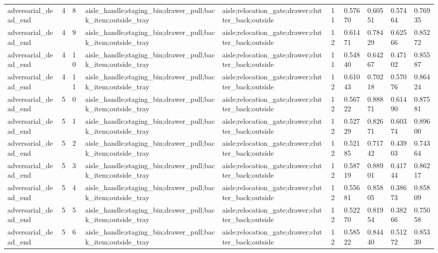 \documentclass{article}
\begin{document}
\begin{table}[tbp]
{\begin{tabular}{llllllllll}
adversarial\_dead\_end & 4 & 8 & aisle\_handle;staging\_bin;drawer\_pull;back\_item;outside\_tray & aisle;relocation\_gate;drawer;clutter\_back;outside & 11 & 0.57670 & 0.60551 & 0.57464 & 0.76935 \\
adversarial\_dead\_end & 4 & 9 & aisle\_handle;staging\_bin;drawer\_pull;back\_item;outside\_tray & aisle;relocation\_gate;drawer;clutter\_back;outside & 12 & 0.61471 & 0.78429 & 0.62566 & 0.85272 \\
adversarial\_dead\_end & 4 & 10 & aisle\_handle;staging\_bin;drawer\_pull;back\_item;outside\_tray & aisle;relocation\_gate;drawer;clutter\_back;outside & 11 & 0.54840 & 0.64267 & 0.47102 & 0.85587 \\
adversarial\_dead\_end & 4 & 11 & aisle\_handle;staging\_bin;drawer\_pull;back\_item;outside\_tray & aisle;relocation\_gate;drawer;clutter\_back;outside & 12 & 0.61043 & 0.70218 & 0.57076 & 0.86424 \\
adversarial\_dead\_end & 5 & 0 & aisle\_handle;staging\_bin;drawer\_pull;back\_item;outside\_tray & aisle;relocation\_gate;drawer;clutter\_back;outside & 12 & 0.56722 & 0.88871 & 0.61490 & 0.87581 \\
adversarial\_dead\_end & 5 & 1 & aisle\_handle;staging\_bin;drawer\_pull;back\_item;outside\_tray & aisle;relocation\_gate;drawer;clutter\_back;outside & 12 & 0.52729 & 0.82671 & 0.60374 & 0.89600 \\
adversarial\_dead\_end & 5 & 2 & aisle\_handle;staging\_bin;drawer\_pull;back\_item;outside\_tray & aisle;relocation\_gate;drawer;clutter\_back;outside & 12 & 0.52185 & 0.71742 & 0.43903 & 0.74364 \\
adversarial\_dead\_end & 5 & 3 & aisle\_handle;staging\_bin;drawer\_pull;back\_item;outside\_tray & aisle;relocation\_gate;drawer;clutter\_back;outside & 12 & 0.58719 & 0.88901 & 0.41744 & 0.86217 \\
adversarial\_dead\_end & 5 & 4 & aisle\_handle;staging\_bin;drawer\_pull;back\_item;outside\_tray & aisle;relocation\_gate;drawer;clutter\_back;outside & 12 & 0.55681 & 0.85805 & 0.38673 & 0.85809 \\
adversarial\_dead\_end & 5 & 5 & aisle\_handle;staging\_bin;drawer\_pull;back\_item;outside\_tray & aisle;relocation\_gate;drawer;clutter\_back;outside & 12 & 0.52270 & 0.81954 & 0.38266 & 0.75058 \\
adversarial\_dead\_end & 5 & 6 & aisle\_handle;staging\_bin;drawer\_pull;back\_item;outside\_tray & aisle;relocation\_gate;drawer;clutter\_back;outside & 12 & 0.58522 & 0.84440 & 0.51272 & 0.85339 \\

\end{tabular}}
\end{table}
\end{document}
